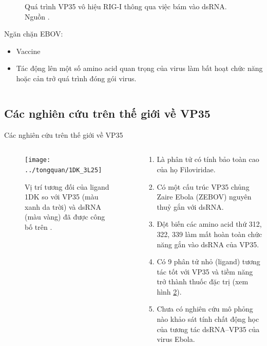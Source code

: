 \documentclass[10pt]{beamer}
\begin{document}
\begin{frame}
\begin{columns}[t]
\begin{column}{0.5\textwidth}
\begin{figure}[h]
		\caption{Quá trình VP35 vô hiệu RIG-I thông qua việc bám vào dsRNA. Nguồn \cite{Ramanan2011}.}
		\label{fig:rig-i}
		\vspace{-15pt}
		\end{figure}
		Ngăn chặn EBOV:
		\begin{itemize}
		\item Vaccine
		\item Tác động lên một số amino acid quan trọng của virus làm bất hoạt chức năng hoặc cản trở quá trình đóng gói virus.
		\end{itemize}
	\end{column}
	
	\end{columns}
	
	\end{frame}
\subsection{Các nghiên cứu trên thế giới về VP35}
	\begin{frame}{Các nghiên cứu trên thế giới về VP35}
		\begin{columns}[t]
		\begin{column}{0.25\textwidth}
			\begin{figure}[t!]
			\centering
			\texttt{[image: ../tongquan/1DK\_3L25]}
			\caption{Vị trí tương đối của ligand 1DK so với VP35 (màu xanh da trời) và dsRNA (màu vàng) đã được công bố trên \cite{Brown2014}.}
			\label{fig:1dk_3l25}
			\end{figure}
		\end{column}
		
		\begin{column}{0.75\textwidth}
			\begin{enumerate}
			\item Là phân tử có tính bảo toàn cao của họ Filoviridae.
			\item Có một cấu trúc VP35 chủng Zaire Ebola (ZEBOV) nguyên thuỷ gắn với dsRNA\cite{Leung2010}.
			\item Đột biến các amino acid thứ 312, 322, 339 làm mất hoàn toàn chức năng gắn vào dsRNA của VP35\cite{Cardenas2006,Hartman2004}.
			\item Có 9 phân tử nhỏ (ligand) tương tác tốt với VP35 và tiềm năng trở thành thuốc đặc trị\cite{Brown2014,Dapiaggi2015} (xem hình \ref{fig:1dk_3l25}).				
			\item Chưa có nghiên cứu mô phỏng nào khảo sát tính chất động học của tương tác dsRNA--VP35 của virus Ebola.
			
			\end{enumerate}
			\end{column}
		\end{columns}
	\end{frame}
	
\end{document}
